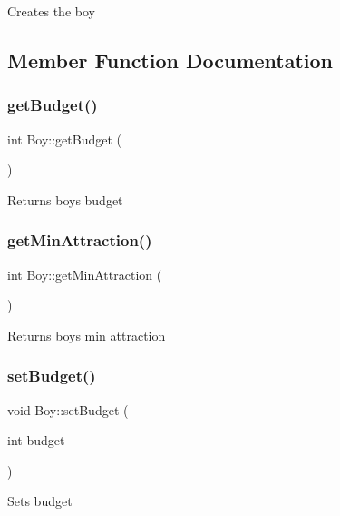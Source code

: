 Creates the boy 

\subsection{Member Function Documentation}
\mbox{\label{class_boy_a05c48b12091ebcad44ba86ba88514ac5}} 
\subsubsection{\texorpdfstring{get\+Budget()}{getBudget()}}
{\footnotesize\ttfamily int Boy\+::get\+Budget (\begin{DoxyParamCaption}{ }\end{DoxyParamCaption})}

Returns boy\textquotesingle{}s budget \mbox{\label{class_boy_a35d84533352a88f6365a28ba21b9f993}} 
\subsubsection{\texorpdfstring{get\+Min\+Attraction()}{getMinAttraction()}}
{\footnotesize\ttfamily int Boy\+::get\+Min\+Attraction (\begin{DoxyParamCaption}{ }\end{DoxyParamCaption})}

Returns boy\textquotesingle{}s min attraction \mbox{\label{class_boy_adb0aa7b4399c4d463129be2b2b9c3b42}} 
\subsubsection{\texorpdfstring{set\+Budget()}{setBudget()}}
{\footnotesize\ttfamily void Boy\+::set\+Budget (\begin{DoxyParamCaption}\item[{int}]{budget }\end{DoxyParamCaption})}

Sets budget \mbox{\label{class_boy_a9e39b3cb4cbc2c0827a34410d9f826fc}} 
